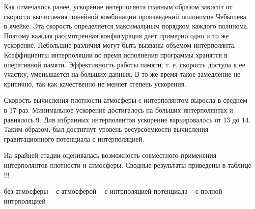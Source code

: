  Как отмечалось ранее, ускорение интерполянта главным образом зависит от скорости
 вычисления линейной комбинации произведений полиномов Чебышева в ячейке. 
 Эта скорость определяется максимальным порядком каждого полинома. Поэтому каждая
 рассмотренная конфигурация дает примерно одно и то же ускорение. Небольшие различия
 могут быть вызваны объемом интерполянта. Коэффициенты интерполяции во время исполнения
 программы хранятся в оперативной памяти. Эффективность работы памяти, 
 т. е. скорость доступа к ее участку, уменьшается на больших данных. В то же время
 такое замедление не критично, так как качественно не меняет степень ускорения.

 Скорость вычисления плотности атмосферы с интерполянтом выросла в среднем в 17 раз.
 Минимальное ускорение достигалось на больших интерполянтах и равнялось 9. Для избранных
 интерполянтов ускорение варьировалось от 13 до 14. Таким образом, был достигнут
 уровень ресурсоемкости вычисления гравитационного потенциала с интерполяцией.

 На крайней стадии оценивалась возможность совместного применения интерполянтов
 плотности и атмосферы. Сводные результаты приведены в таблице !!!

 без атмосферы -- с атмосферой -- с интрполяцией потенциала -- с полной интрполяцией

